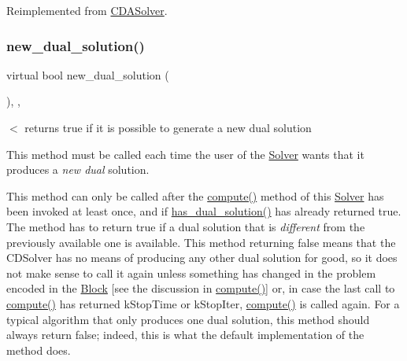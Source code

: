 Reimplemented from \mbox{\hyperlink{class_s_m_spp__di__unipi__it_1_1_c_d_a_solver_ae281b6699b0707a5cdc1e82b76d26c09}{C\+D\+A\+Solver}}.

\mbox{\label{class_s_m_spp__di__unipi__it_1_1_m_c_f_solver_aa78ff49c515c8c6e2da6216d104dc219}} 
\subsubsection{\texorpdfstring{new\+\_\+dual\+\_\+solution()}{new\_dual\_solution()}}
{\footnotesize\ttfamily virtual bool new\+\_\+dual\+\_\+solution (\begin{DoxyParamCaption}\item[{void}]{ }\end{DoxyParamCaption})\hspace{0.3cm}{\ttfamily [inline]}, {\ttfamily [override]}, {\ttfamily [virtual]}}



$<$ returns true if it is possible to generate a new dual solution 

This method must be called each time the user of the \mbox{\hyperlink{class_s_m_spp__di__unipi__it_1_1_solver}{Solver}} wants that it produces a {\itshape new dual} solution.

This method can only be called after the \mbox{\hyperlink{class_s_m_spp__di__unipi__it_1_1_m_c_f_solver_afc8ff54ab05d22f4cca0fb0bfbeb7a49}{compute()}} method of this \mbox{\hyperlink{class_s_m_spp__di__unipi__it_1_1_solver}{Solver}} has been invoked at least once, and if \mbox{\hyperlink{class_s_m_spp__di__unipi__it_1_1_m_c_f_solver_ac179f31ab4f3e55a7f03b152d065edbd}{has\+\_\+dual\+\_\+solution()}} has already returned true. The method has to return true if a dual solution that is {\itshape different} from the previously available one is available. This method returning false means that the C\+D\+Solver has no means of producing any other dual solution for good, so it does not make sense to call it again unless something has changed in the problem encoded in the \mbox{\hyperlink{class_s_m_spp__di__unipi__it_1_1_block}{Block}} \mbox{[}see the discussion in \mbox{\hyperlink{class_s_m_spp__di__unipi__it_1_1_m_c_f_solver_afc8ff54ab05d22f4cca0fb0bfbeb7a49}{compute()}}\mbox{]} or, in case the last call to \mbox{\hyperlink{class_s_m_spp__di__unipi__it_1_1_m_c_f_solver_afc8ff54ab05d22f4cca0fb0bfbeb7a49}{compute()}} has returned k\+Stop\+Time or k\+Stop\+Iter, \mbox{\hyperlink{class_s_m_spp__di__unipi__it_1_1_m_c_f_solver_afc8ff54ab05d22f4cca0fb0bfbeb7a49}{compute()}} is called again. For a typical algorithm that only produces one dual solution, this method should always return false; indeed, this is what the default implementation of the method does.

